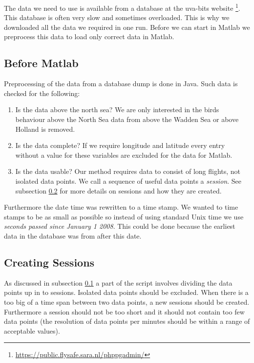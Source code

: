 The data we need to use is available from a database at the uva-bits website
\footnote{\url{https://public.flysafe.sara.nl/phppgadmin/} }. This database is often very slow 
and sometimes overloaded. This is why we downloaded all the data we required in one run. 
Before we can start in Matlab we preprocess this data to load only correct data in Matlab.

\subsection{Before Matlab}
\label{subsec:beforeMatlab}
Preprocessing of the data from a database dump is done in Java. Such data 
is checked for the following: 
\begin{enumerate}
    \item Is the data above the north sea? We are only interested in the birds behaviour 
    above the North Sea data from above the Wadden Sea or above Holland is removed.
    \item Is the data complete? If we require longitude and latitude every entry 
    without a value for these variables are excluded for the data for Matlab. 
    \item Is the data usable? Our method requires data to consist of long flights,
    not isolated data points. We call a sequence of useful data points a \textit{session}. 
    See subsection \ref{subsec:creatingSessions} for more details on sessions and how
    they are created.
\end{enumerate}

Furthermore the date time was rewritten to a time stamp. We wanted to time stamps to be 
as small as possible so instead of using standard Unix time we use \textit{seconds passed
since 
January 1 2008}. This could be done because the earliest data in the database was from after
this date. 

\subsection{Creating Sessions}
\label{subsec:creatingSessions}
As discussed in subsection \ref{subsec:beforeMatlab} a part of the script involves 
dividing the data points up in to sessions. Isolated data points should be excluded. 
When there is a too big of a time span between two data points, a new sessions should be 
created. Furthermore a session should not be too short and it should not contain too few
data points (the resolution of data points per minutes should be within a range of 
acceptable values). 

